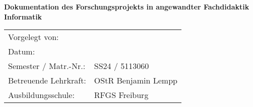 \makeatletter
\begin{titlepage}
	\Large
	\centering
	\@title
	\vfill
	\Huge
	\textbf{Dokumentation des Forschungsprojekts in angewandter Fachdidaktik Informatik}
	\vfill
	\normalsize
	\begin{tabular*}{\linewidth}{@{\extracolsep{\fill}} ll}
		Vorgelegt von: & \@author \\
		Datum: & \@date \\
		Semester / Matr.-Nr.: & SS24 / 5113060 \\
		Betreuende Lehrkraft: & OStR Benjamin Lempp \\
		Ausbildungsschule: & RFGS Freiburg
	\end{tabular*}
\end{titlepage}
\makeatother
\restoregeometry